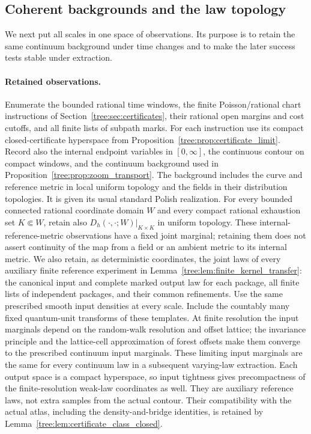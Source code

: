 \subsection{Coherent backgrounds and the law topology}
\label{tree:sec:coherent-background}

We next put all scales in one space of observations.  Its purpose is
to retain the same continuum background under time changes and to
make the later success tests stable under extraction.

\paragraph{Retained observations.}
Enumerate the
bounded rational time windows, the finite Poisson/rational chart
instructions of Section~\ref{tree:sec:certificates}, their rational
open margins and cost cutoffs, and all finite lists of subpath
marks.  For each instruction use its compact closed-certificate
hyperspace from Proposition~\ref{tree:prop:certificate_limit}.  Record
also the internal endpoint variables in $[0,\infty]$, the
continuous contour on compact windows, and the continuum
background used in Proposition~\ref{tree:prop:zoom_transport}.
The background includes the curve and reference metric in local
uniform topology and the fields in their distribution topologies.  It is
given its usual standard Polish realization.  For every bounded
connected rational coordinate domain $W$ and every compact
rational exhaustion set $K\Subset W$, retain also
$D_h(\cdot,\cdot;W)|_{K\times K}$ in uniform topology.
These internal-reference-metric observations have a fixed
joint marginal; retaining them does not assert continuity
of the map from a field or an ambient metric to its internal
metric.  We also retain,
as deterministic coordinates, the joint laws of every auxiliary
finite reference experiment in
Lemma~\ref{tree:lem:finite_kernel_transfer}: the canonical input
and complete marked output law for each package, all finite
lists of independent packages, and their common refinements.
Use the same prescribed smooth input densities at every scale.
Include the countably many fixed quantum-unit transforms of
these templates.  At finite resolution the input marginals
depend on the random-walk resolution and offset lattice;
the invariance principle and the lattice-cell approximation of
forest offsets make them converge to the prescribed continuum input
marginals.  These limiting
input marginals are the same for every continuum law in a
subsequent varying-law extraction.  Each output space is a
compact hyperspace, so input tightness gives precompactness
of the finite-resolution weak-law coordinates as well.
They are auxiliary reference
laws, not extra samples from the actual contour.  Their
compatibility with the actual atlas, including the
density-and-bridge identities, is retained by
Lemma~\ref{tree:lem:certificate_class_closed}.

